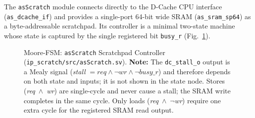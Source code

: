The \texttt{asScratch} module connects directly to the D-Cache CPU
interface (\texttt{as\_dcache\_if}) and provides a single-port 64-bit
wide SRAM (\texttt{as\_sram\_sp64}) as a byte-addressable scratchpad.
Its controller is a minimal two-state machine whose state is captured by
the single registered bit \texttt{busy\_r} (Fig.~\ref{fig:asScratchFsm01}).

\begin{figure}[H]
\centering
{}
\caption{Moore-FSM: \texttt{asScratch} Scratchpad Controller
  (\texttt{ip\_scratch/src/asScratch.sv}).
  \textbf{Note:} The \texttt{dc\_stall\_o} output is a Mealy signal
  (\textit{stall} $= \mathit{req} \wedge \neg\mathit{wr} \wedge
  \neg\mathit{busy\_r}$) and therefore depends on both state and
  inputs; it is not shown in the state node.
  Stores (\textit{req}~$\wedge$~\textit{wr}) are single-cycle and
  never cause a stall; the SRAM write completes in the same cycle.
  Only loads (\textit{req}~$\wedge$~$\neg$\textit{wr}) require one
  extra cycle for the registered SRAM read output.}
\label{fig:asScratchFsm01}
\end{figure}

